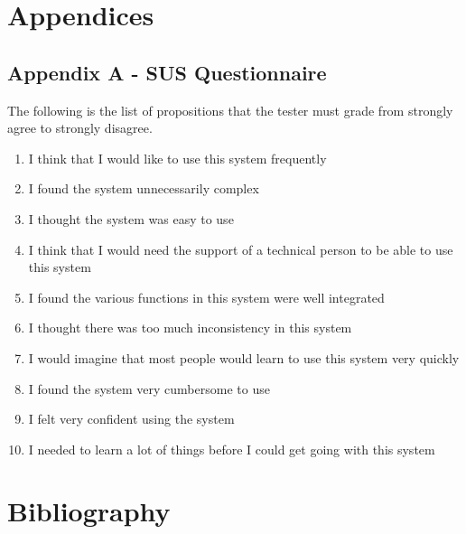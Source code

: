 \documentclass[12pt]{report}
\begin{document}
\newpage

\part{Appendices}
\label{sec:org6f41a0f}
\chapter{Appendix A - SUS Questionnaire}
\label{sec:orgf66f036}
The following is the list of propositions that the tester must grade from
strongly agree to strongly disagree.
\begin{enumerate}
\item I think that I would like to use this system frequently
\item I found the system unnecessarily complex
\item I thought the system was easy to use
\item I think that I would need the support of a technical person to be able to use this system
\item I found the various functions in this system were well integrated
\item I thought there was too much inconsistency in this system
\item I would imagine that most people would learn to use this system very quickly
\item I found the system very cumbersome to use
\item I felt very confident using the system
\item I needed to learn a lot of things before I could get going with this system
\end{enumerate}

\newpage

\part{Bibliography}
\label{sec:org42f2ba0}
\end{document}
